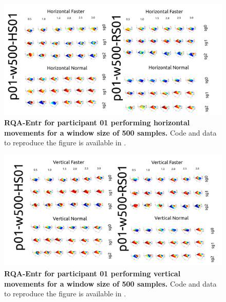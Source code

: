 \documentclass[12pt]{article}
\begin{document}
\newpage
\begin{figure}[ht!]
\centering
\includegraphics{figures/rqa/output/epsilons/rqa-epsilonsp01w500Horizontal}
    	\caption{
	{\bf RQA-Entr for participant 01 performing horizontal movements for a window size of 500 samples.}
	Code and data to reproduce the figure is available in \cite{srep2021}.
        }
    \label{fig-p01-H-w500}
\end{figure}
\begin{figure}[hb!]
\centering
\includegraphics{figures/rqa/output/epsilons/rqa-epsilonsp01w500Vertical}
    	\caption{
	{\bf RQA-Entr for participant 01 performing vertical movements for a window size of 500 samples.}
	Code and data to reproduce the figure is available in \cite{srep2021}.
        }
    \label{fig-p01-V-w500}
\end{figure}
\end{document}

